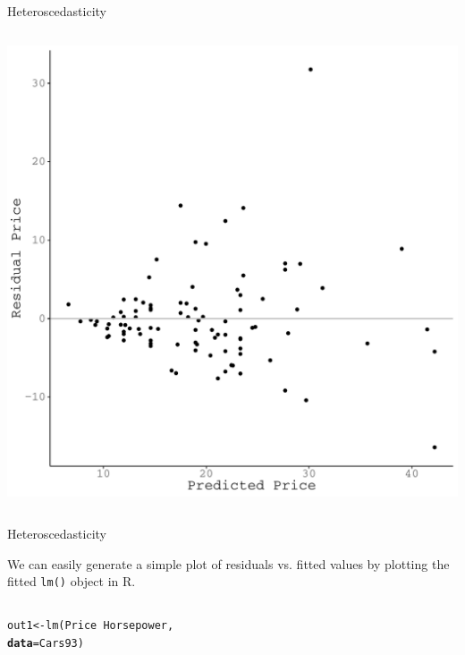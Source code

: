 \documentclass[10pt]{beamer}\usepackage[]{graphicx}\usepackage[]{color}
\makeatletter
\def\maxwidth{ %
  \ifdim\Gin@nat@width>\linewidth
    \linewidth
  \else
    \Gin@nat@width
  \fi
}
\newcommand{\hlopt}[1]{\textcolor[rgb]{0,0,0}{#1}}%
\newcommand{\hlstd}[1]{\textcolor[rgb]{0,0,0}{#1}}%
\newcommand{\hlkwb}[1]{\textcolor[rgb]{0,0.341,0.682}{#1}}%
\newcommand{\hlkwc}[1]{\textcolor[rgb]{0,0,0}{\textbf{#1}}}%
\newcommand{\hlkwd}[1]{\textcolor[rgb]{0.004,0.004,0.506}{#1}}%
\newenvironment{kframe}{%
 \def\at@end@of@kframe{}%
 \ifinner\ifhmode%
  \def\at@end@of@kframe{\end{minipage}}%
  \begin{minipage}{\columnwidth}%
 \fi\fi%
 \def\FrameCommand##1{\hskip\@totalleftmargin \hskip-\fboxsep
 \colorbox{shadecolor}{##1}\hskip-\fboxsep
     \hskip-\linewidth \hskip-\@totalleftmargin \hskip\columnwidth}%
 \MakeFramed {\advance\hsize-\width
   \@totalleftmargin\z@ \linewidth\hsize
   \@setminipage}}%
 {\par\unskip\endMakeFramed%
 \at@end@of@kframe}
\newenvironment{knitrout}{}{} %
\makeatother
\begin{document}
{\begin{frame}{Heteroscedasticity}
\begin{columns}
\begin{column}{0.5\textwidth}
\begin{knitrout}
{\centering \includegraphics[width=\maxwidth]{figure/assumptions-unnamed-chunk-6-1} 

}


\end{knitrout}

\end{column}
\end{columns}

\end{frame}


\begin{frame}[fragile]{Heteroscedasticity}

  We can easily generate a simple plot of residuals vs. fitted values by
  plotting the fitted \texttt{lm()} object in R.

  \begin{columns}
    \begin{column}{0.5\textwidth}

\begin{knitrout}\footnotesize
{}\color{fgcolor}\begin{kframe}
\begin{alltt}
\hlstd{out1} \hlkwb{<-} \hlkwd{lm}\hlstd{(Price} \hlopt{~} \hlstd{Horsepower,}
           \hlkwc{data} \hlstd{= Cars93)}


\end{alltt}
\end{kframe}
\end{knitrout}
\end{column}
\end{columns}
\end{frame}}
\end{document}
